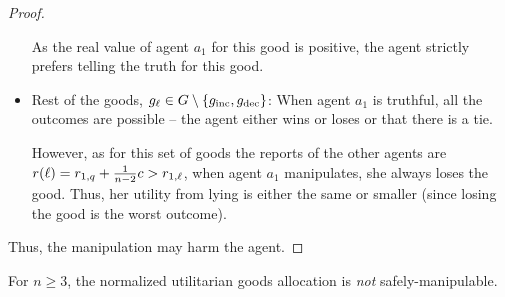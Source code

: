 \begin{proof}
\begin{itemize}
        As the real value of agent $a_1$ for this good is positive, the agent strictly prefers telling the truth for this good.

        \item Rest of the goods, $g_{\ell} \in G \setminus \{g_{\mathrm{inc}}, g_{\mathrm{dec}}\}$:
        When agent $a_1$ is truthful, all the outcomes are possible -- the agent either wins or loses or that there is a tie.    
        
        However, as for this set of goods the reports of the other agents are $r(\ell) = r_{1,q}+\frac{1}{n-2}c > r_{1,\ell}$, when agent $a_1$ manipulates, she always loses the good.
        Thus, her utility from lying is either the same or smaller (since losing the good is the worst outcome).

    \end{itemize}

    Thus, the manipulation may harm the agent.
\end{proof}



\iffalse

\begin{claim}\label{normalized-more-than-2-agents-at least-2-goods}
   For $n \geq 3$, the normalized utilitarian goods allocation is \emph{not} safely-manipulable.
\end{claim}


